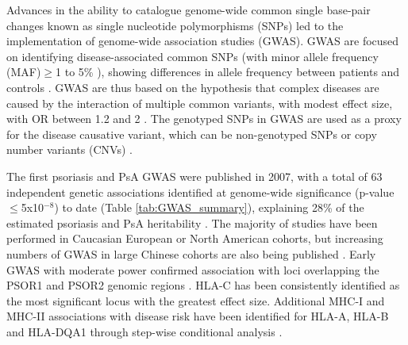Advances in the ability to catalogue genome-wide common single base-pair changes known as single nucleotide polymorphisms (SNPs) led to the implementation of genome-wide association studies (GWAS). GWAS are focused on identifying disease-associated common SNPs (with minor allele frequency (MAF)$\geq$1 to 5\% ), showing differences in allele frequency between patients and controls \parencite{Ku2010}. GWAS are thus based on the hypothesis that complex diseases are caused by the interaction of multiple common variants, with modest effect size, with OR between 1.2 and 2 \parencite{Schork2009, Cui2010}. The genotyped SNPs in GWAS are used as a proxy for the disease causative variant, which can be non-genotyped SNPs or copy number variants (CNVs) \parencite{Hirschhorn2005, Ku2010}.


The first psoriasis and PsA GWAS were published in 2007, with a total of 63 independent genetic associations identified at genome-wide significance (p-value$\leq$5x10$^{-8}$) to date (Table \ref{tab:GWAS_summary}), explaining 28\% of the estimated psoriasis and PsA heritability  \parencite{Tsoi2017}. The majority of studies have been performed in Caucasian European or North American cohorts, but increasing numbers of GWAS in large Chinese cohorts are also being published \parencite{Zhang2009, Sun2010, Yin2015}. Early GWAS with moderate power confirmed association with loci overlapping the PSOR1 and PSOR2 genomic regions  \parencite{Cargill2007,Strange2010}. HLA-C has been consistently identified as the most significant locus with the greatest effect size. Additional MHC-I and MHC-II associations with disease risk have been identified for HLA-A, HLA-B and HLA-DQA1 through step-wise conditional analysis \parencite{Okada2014}. 

